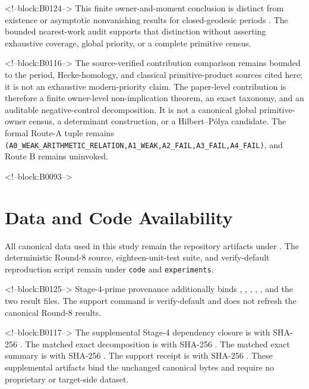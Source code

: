 \documentclass[11pt]{article}
\theoremstyle{definition}
\theoremstyle{remark}
\begin{document}
<!--block:B0124-->
This finite owner-and-moment conclusion is distinct from existence or asymptotic nonvanishing results for closed-geodesic periods \citep{Katok1985,ConstantinescuNordentoft2025}. The bounded nearest-work audit supports that distinction without asserting exhaustive coverage, global priority, or a complete primitive census.

<!--block:B0116-->
The source-verified contribution comparison remains bounded to the period, Hecke-homology, and classical primitive-product sources cited here; it is not an exhaustive modern-priority claim. The paper-level contribution is therefore a finite owner-level non-implication theorem, an exact taxonomy, and an auditable negative-control decomposition. It is not a canonical global primitive-owner census, a determinant construction, or a Hilbert--Pólya candidate. The formal Route-A tuple remains \texttt{(A0\_WEAK\_ARITHMETIC\_RELATION,A1\_WEAK,A2\_FAIL,A3\_FAIL,A4\_FAIL)}, and Route B remains uninvoked.

<!--block:B0093-->
\section*{Data and Code Availability}
All canonical data used in this study remain the repository artifacts under
.
The deterministic Round-8 source, eighteen-unit-test suite, and verify-default reproduction script remain under \texttt{code} and \texttt{experiments}.

<!--block:B0125-->
Stage-4-prime provenance additionally binds , , , , , and the two  result files. The support command is verify-default and does not refresh the canonical Round-8 results.

<!--block:B0117-->
The supplemental Stage-4 dependency closure is
with SHA-256
.
The matched exact decomposition is
with SHA-256
.
The matched exact summary is
with SHA-256
.
The support receipt is
with SHA-256
.
These supplemental artifacts bind the unchanged canonical bytes and require no proprietary or target-side dataset.
\end{document}
